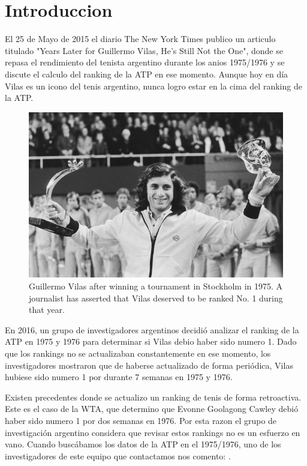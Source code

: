 \section{Introduccion}

El 25 de Mayo de 2015 el diario The New York Times publico un articulo titulado "Years Later for Guillermo Vilas, He’s Still Not the One", donde se repasa el rendimiento del tenista argentino durante los anios 1975/1976 y se discute el calculo del ranking de la ATP en ese momento. Aunque hoy en día Vilas es un icono del tenis argentino, nunca logro estar en la cima del ranking de la ATP.

\begin{figure}[H]
  \centering
  \includegraphics[scale=6]{images/nyt}
  \caption{Guillermo Vilas after winning a tournament in Stockholm in 1975. A journalist has asserted that Vilas deserved to be ranked No. 1 during that year. }
\end{figure}

En 2016, un grupo de investigadores argentinos decidió analizar el ranking de la ATP en 1975 y 1976 para determinar si Vilas debio haber sido numero 1. Dado que los rankings no se actualizaban constantemente en ese momento, los investigadores mostraron que de haberse actualizado de forma periódica, Vilas hubiese sido numero 1 por durante 7 semanas en 1975 y 1976.

Existen precedentes donde se actualizo un ranking de tenis de forma retroactiva. Este es el caso de la WTA, que determino que Evonne Goolagong Cawley debió haber sido numero 1 por dos semanas en 1976. Por esta razon el grupo de investigación argentino considera que revisar estos rankings no es un esfuerzo en vano. Cuando buscábamos los datos de la ATP en el 1975/1976, uno de los investigadores de este equipo que contactamos nos comento: .


